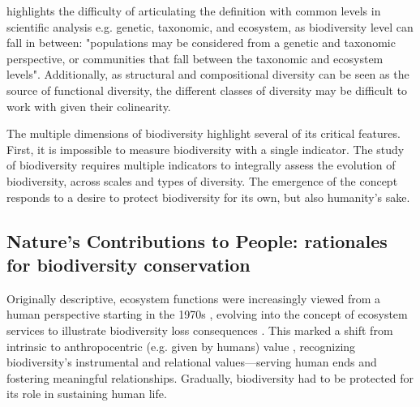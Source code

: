 \cite{mouysset_diversity_2023} highlights the difficulty of articulating the definition with common levels in scientific analysis e.g. genetic, taxonomic, and ecosystem, as biodiversity level can fall in between: "populations may be considered from a genetic and taxonomic perspective, or communities that fall between the taxonomic and ecosystem levels". Additionally, as structural and compositional diversity can be seen as the source of functional diversity, the different classes of diversity may be difficult to work with given their colinearity. 

The multiple dimensions of biodiversity highlight several of its critical features. First, it is impossible to measure biodiversity with a single indicator. The study of biodiversity requires multiple indicators to integrally assess the evolution of biodiversity, across scales and types of diversity. The emergence of the concept responds to a desire to protect biodiversity for its own, but also humanity's sake. 

\clearpage
\subsection*{Nature's Contributions to People: rationales for biodiversity conservation}


Originally descriptive, ecosystem functions were increasingly viewed from a human perspective starting in the 1970s \citep{hueting1969functions, schumacher1973small}, evolving into the concept of ecosystem services \citep{ehrlich1981extinction} to illustrate biodiversity loss consequences \citep{gomez_history_2010}. This marked a shift from intrinsic to anthropocentric (e.g. given by humans) value \citep{mouysset_diversity_2023}, recognizing biodiversity’s instrumental and relational values—serving human ends and fostering meaningful relationships. Gradually, biodiversity had to be protected for its role in sustaining human life.



